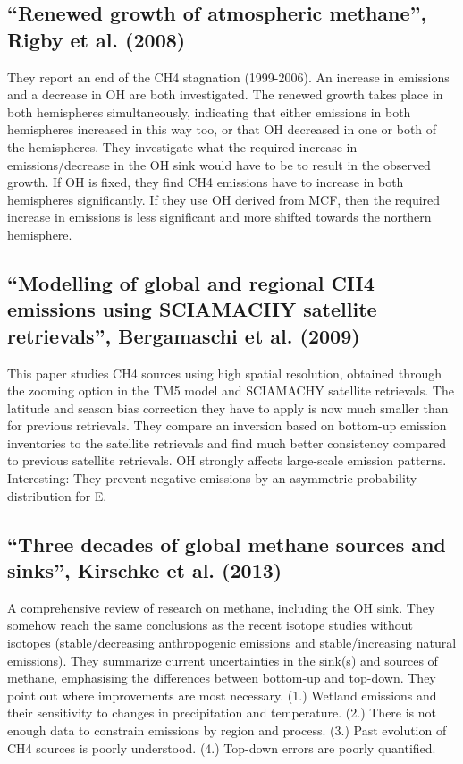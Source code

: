 {\subsection{“Renewed growth of atmospheric methane”, Rigby et al. (2008)}
They report an end of the CH4 stagnation (1999-2006). An increase in emissions and a decrease in OH are both investigated. The renewed growth takes place in both hemispheres simultaneously, indicating that either emissions in both hemispheres increased in this way too, or that OH decreased in one or both of the hemispheres.
They investigate what the required increase in emissions/decrease in the OH sink would have to be to result in the observed growth. If OH is fixed, they find CH4 emissions have to increase in both hemispheres significantly. If they use OH derived from MCF, then the required increase in emissions is less significant and more shifted towards the northern hemisphere.

\subsection{“Modelling of global and regional CH4 emissions using SCIAMACHY satellite retrievals”, Bergamaschi et al. (2009)}
This paper studies CH4 sources using high spatial resolution, obtained through the zooming option in the TM5 model and SCIAMACHY satellite retrievals. The latitude and season bias correction they have to apply is now much smaller than for previous retrievals. They compare an inversion based on bottom-up emission inventories to the satellite retrievals and find much better consistency compared to previous satellite retrievals. OH strongly affects large-scale emission patterns. Interesting: They prevent negative emissions by an asymmetric probability distribution for E.

\subsection{“Three decades of global methane sources and sinks”, Kirschke et al. (2013)}
A comprehensive review of research on methane, including the OH sink. They somehow reach the same conclusions as the recent isotope studies without isotopes (stable/decreasing anthropogenic emissions and stable/increasing natural emissions). They summarize current uncertainties in the sink(s) and sources of methane, emphasising the differences between bottom-up and top-down.
They point out where improvements are most necessary. (1.) Wetland emissions and their sensitivity to changes in precipitation and temperature. (2.) There is not enough data to constrain emissions by region and process. (3.) Past evolution of CH4 sources is poorly understood. (4.) Top-down errors are poorly quantified.

}
